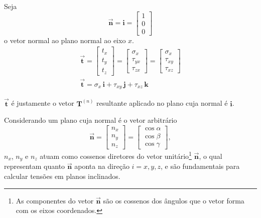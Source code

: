 \documentclass[11pt]{article}
\begin{document}
	Seja
	\[
	\boldsymbol{\vec{n}}=\mathbf{i}=
	\begin{bmatrix}
		1 \\
		0 \\
		0
	\end{bmatrix}
	\]
	o vetor normal ao plano normal ao eixo $x$.
	\begin{gather*}
		\boldsymbol{\vec{t}} =
		\begin{bmatrix}
			t_x \\
			t_y \\
			t_z
		\end{bmatrix}
		=
		\begin{bmatrix}
			\sigma_{x} \\
			\tau_{yx} \\
			\tau_{zx}
		\end{bmatrix}
		=
		\begin{bmatrix}
			\sigma_{x} \\
			\tau_{xy} \\
			\tau_{xz}
		\end{bmatrix}
		\\
		\boldsymbol{\vec{t}}=\sigma_x \,\mathbf{i}+\tau_{xy}\,\mathbf{j}+\tau_{xz}\,\mathbf{k}
	\end{gather*}

	$\boldsymbol{\vec{t}}$ é justamente o vetor $\mathbf{T}^{(n)}$ resultante aplicado no plano cuja normal é $\mathbf{i}$.
	
	Considerando um plano cuja normal é o vetor arbitrário
	\[
	\boldsymbol{\vec{n}}=
	\begin{bmatrix}
		n_x \\
		n_y \\
		n_z
	\end{bmatrix}
	=
	\begin{bmatrix}
		\cos \alpha \\
		\cos \beta \\
		\cos \gamma
	\end{bmatrix},
	\]
	$n_x$, $n_y$ e $n_z$ atuam como cossenos diretores do vetor unitário\footnote{As componentes do vetor $\boldsymbol{\vec{n}}$ são os cossenos dos ângulos que o vetor forma com os eixos coordenados.} $\boldsymbol{\vec{n}}$, o qual representam quanto $\boldsymbol{\vec{n}}$ aponta na direção $i=x,y,z$, e são fundamentais para calcular tensões em planos inclinados.
	
\end{document}
